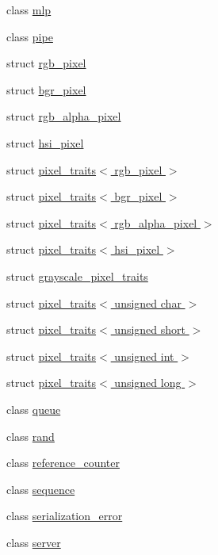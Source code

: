 \begin{DoxyCompactItemize}
\item 
class \hyperlink{classdlib_1_1mlp}{mlp}
\item 
class \hyperlink{classdlib_1_1pipe}{pipe}
\item 
struct \hyperlink{structdlib_1_1rgb__pixel}{rgb\_\-pixel}
\item 
struct \hyperlink{structdlib_1_1bgr__pixel}{bgr\_\-pixel}
\item 
struct \hyperlink{structdlib_1_1rgb__alpha__pixel}{rgb\_\-alpha\_\-pixel}
\item 
struct \hyperlink{structdlib_1_1hsi__pixel}{hsi\_\-pixel}
\item 
struct \hyperlink{structdlib_1_1pixel__traits_3_01rgb__pixel_01_4}{pixel\_\-traits$<$ rgb\_\-pixel $>$}
\item 
struct \hyperlink{structdlib_1_1pixel__traits_3_01bgr__pixel_01_4}{pixel\_\-traits$<$ bgr\_\-pixel $>$}
\item 
struct \hyperlink{structdlib_1_1pixel__traits_3_01rgb__alpha__pixel_01_4}{pixel\_\-traits$<$ rgb\_\-alpha\_\-pixel $>$}
\item 
struct \hyperlink{structdlib_1_1pixel__traits_3_01hsi__pixel_01_4}{pixel\_\-traits$<$ hsi\_\-pixel $>$}
\item 
struct \hyperlink{structdlib_1_1grayscale__pixel__traits}{grayscale\_\-pixel\_\-traits}
\item 
struct \hyperlink{structdlib_1_1pixel__traits_3_01unsigned_01char_01_4}{pixel\_\-traits$<$ unsigned char $>$}
\item 
struct \hyperlink{structdlib_1_1pixel__traits_3_01unsigned_01short_01_4}{pixel\_\-traits$<$ unsigned short $>$}
\item 
struct \hyperlink{structdlib_1_1pixel__traits_3_01unsigned_01int_01_4}{pixel\_\-traits$<$ unsigned int $>$}
\item 
struct \hyperlink{structdlib_1_1pixel__traits_3_01unsigned_01long_01_4}{pixel\_\-traits$<$ unsigned long $>$}
\item 
class \hyperlink{classdlib_1_1queue}{queue}
\item 
class \hyperlink{classdlib_1_1rand}{rand}
\item 
class \hyperlink{classdlib_1_1reference__counter}{reference\_\-counter}
\item 
class \hyperlink{classdlib_1_1sequence}{sequence}
\item 
class \hyperlink{classdlib_1_1serialization__error}{serialization\_\-error}
\item 
class \hyperlink{classdlib_1_1server}{server}

\end{DoxyCompactItemize}

